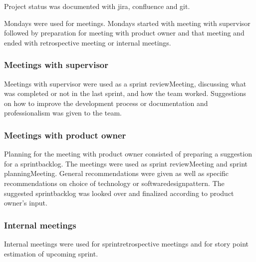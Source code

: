 Project status was documented with \gls{jira}, \gls{confluence} and \gls{git}.

Mondays were used for meetings. Mondays started with meeting with supervisor followed by preparation for meeting with product owner and that meeting and ended with retrospective meeting or internal meetings.

\subsubsection{Meetings with supervisor}
Meetings with supervisor were used as a \gls{sprint} \gls{reviewMeeting}, discussing what was completed or not in the last \gls{sprint}, and how the team worked. Suggestions on how to improve the development process or documentation and professionalism was given to the team.  

\subsubsection{Meetings with product owner}


Planning for the meeting with product owner consisted of preparing a suggestion for a \gls{sprintbacklog}. The meetings were used as \gls{sprint} \gls{reviewMeeting} and \gls{sprint} \gls{planningMeeting}. General recommendations were given as well as specific recommendations on choice of technology or \gls{softwaredesignpattern}. The suggested \gls{sprintbacklog} was looked over and finalized according to product owner's input. 

\subsubsection{Internal meetings}
Internal meetings were used for \gls{sprintretrospective} meetings and for story point estimation of upcoming \gls{sprint}. 

